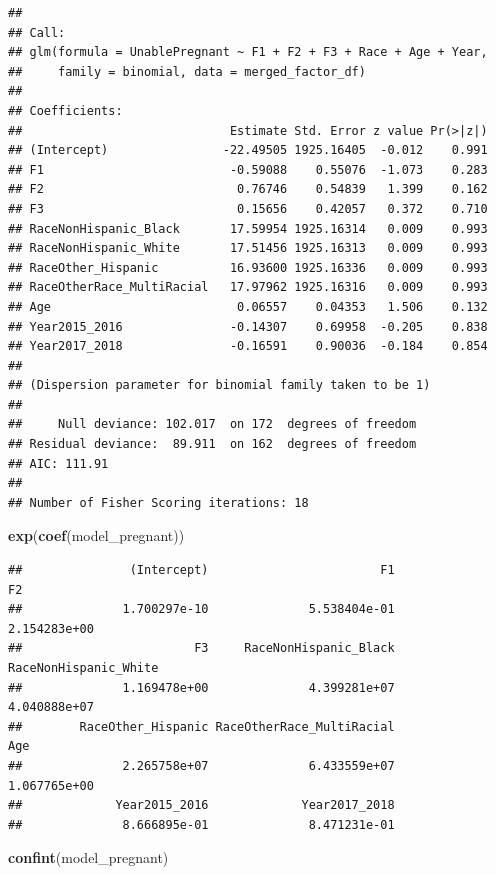 \documentclass[
]{article}
\newenvironment{Shaded}{\begin{snugshade}}{\end{snugshade}}
\newcommand{\FunctionTok}[1]{\textcolor[rgb]{0.13,0.29,0.53}{\textbf{#1}}}
\newcommand{\NormalTok}[1]{#1}
\begin{document}
\begin{verbatim}
## 
## Call:
## glm(formula = UnablePregnant ~ F1 + F2 + F3 + Race + Age + Year, 
##     family = binomial, data = merged_factor_df)
## 
## Coefficients:
##                             Estimate Std. Error z value Pr(>|z|)
## (Intercept)                -22.49505 1925.16405  -0.012    0.991
## F1                          -0.59088    0.55076  -1.073    0.283
## F2                           0.76746    0.54839   1.399    0.162
## F3                           0.15656    0.42057   0.372    0.710
## RaceNonHispanic_Black       17.59954 1925.16314   0.009    0.993
## RaceNonHispanic_White       17.51456 1925.16313   0.009    0.993
## RaceOther_Hispanic          16.93600 1925.16336   0.009    0.993
## RaceOtherRace_MultiRacial   17.97962 1925.16316   0.009    0.993
## Age                          0.06557    0.04353   1.506    0.132
## Year2015_2016               -0.14307    0.69958  -0.205    0.838
## Year2017_2018               -0.16591    0.90036  -0.184    0.854
## 
## (Dispersion parameter for binomial family taken to be 1)
## 
##     Null deviance: 102.017  on 172  degrees of freedom
## Residual deviance:  89.911  on 162  degrees of freedom
## AIC: 111.91
## 
## Number of Fisher Scoring iterations: 18
\end{verbatim}

\begin{Shaded}
\begin{Highlighting}[]
\FunctionTok{exp}\NormalTok{(}\FunctionTok{coef}\NormalTok{(model\_pregnant))}
\end{Highlighting}
\end{Shaded}

\begin{verbatim}
##               (Intercept)                        F1                        F2 
##              1.700297e-10              5.538404e-01              2.154283e+00 
##                        F3     RaceNonHispanic_Black     RaceNonHispanic_White 
##              1.169478e+00              4.399281e+07              4.040888e+07 
##        RaceOther_Hispanic RaceOtherRace_MultiRacial                       Age 
##              2.265758e+07              6.433559e+07              1.067765e+00 
##             Year2015_2016             Year2017_2018 
##              8.666895e-01              8.471231e-01
\end{verbatim}

\begin{Shaded}
\begin{Highlighting}[]
\FunctionTok{confint}\NormalTok{(model\_pregnant)}
\end{Highlighting}
\end{Shaded}
\end{document}
